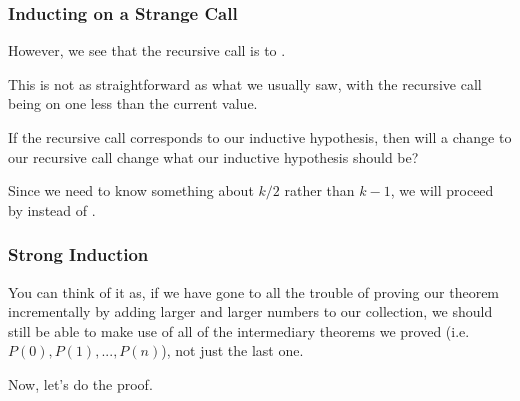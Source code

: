 \documentclass[aspectratio=169]{beamer}
\begin{document}
\begin{frame}[fragile]
  \frametitle{Inducting on a Strange Call}

  However, we see that the recursive call is to .

  \pause
  \vspace{\fill}
  
  This is not as straightforward as what we usually saw, with the recursive
  call being on one less than the current value.

  \pause
  \vspace{\fill}

  If the recursive call corresponds to our inductive hypothesis, then will
  a change to our recursive call change what our inductive hypothesis 
  should be?

  \pause
  \vspace{\fill}


  \pause
  \vspace{\fill}

  Since we need to know something about $k/2$ rather than $k - 1$, we will
  proceed by  instead of .
\end{frame}

\begin{frame}[fragile]
  \frametitle{Strong Induction}


  \pause
  \vspace{\fill}

  You can think of it as, if we have gone to all the trouble of proving our
  theorem incrementally by adding larger and larger numbers to our collection,
  we should still be able to make use of all of the intermediary theorems
  we proved (i.e. $P(0), P(1), ..., P(n)$), not just the last one.

  \vspace{\fill}

  Now, let's do the proof.
\end{frame}
\end{document}
